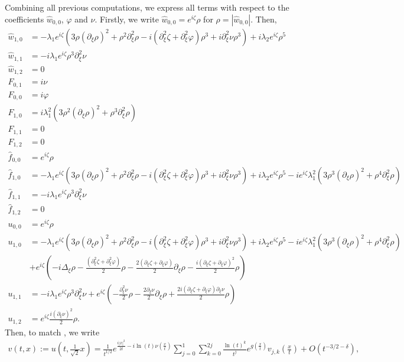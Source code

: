 \documentclass[a4paper, 15pt]{article}
\numberwithin{equation}{section}
\begin{document}
Combining all previous computations, we express all terms with respect to the coefficients $\hat{w}_{0,0}$, $\varphi$ and $\nu$. Firstly, we write $\hat{w}_{0,0}=e^{i\zeta}\rho$ for $\rho=|\hat{w}_{0,0}|$. Then, 
\begin{align*}
\hat{w}_{1,0}&=-\lambda_1e^{i\zeta}(3\rho(\partial_\xi\rho)^2+\rho^2\partial^2_\xi\rho-i(\partial_\xi^2\zeta+\partial_\xi^2\varphi)\rho^3+i\partial^2_\xi\nu\rho^3)+i\lambda_2e^{i\zeta}\rho^5\\
\hat{w}_{1,1}&=-i\lambda_1e^{i\zeta}\rho^3\partial^2_\xi\nu\\
\hat{w}_{1,2}&=0\\
F_{0,1}&=i\nu\\
F_{0,0}&=i\varphi\\
F_{1,0}&=i\lambda_1^2(3\rho^2(\partial_\xi\rho)^2+\rho^3\partial^2_\xi\rho)\\
F_{1,1}&=0\\
F_{1,2}&=0\\
\hat{f}_{0,0}&=e^{i\zeta}\rho\\
\hat{f}_{1,0}&=-\lambda_1e^{i\zeta}(3\rho(\partial_\xi\rho)^2+\rho^2\partial^2_\xi\rho-i(\partial_\xi^2\zeta+\partial_\xi^2\varphi)\rho^3+i\partial^2_\xi\nu\rho^3)+i\lambda_2e^{i\zeta}\rho^5-ie^{i\zeta}\lambda_1^2(3\rho^3(\partial_\xi\rho)^2+\rho^4\partial^2_\xi\rho)\\
\hat{f}_{1,1}&=-i\lambda_1e^{i\zeta}\rho^3\partial^2_\xi\nu\\
\hat{f}_{1,2}&=0\\
u_{0,0}&=e^{i\zeta}\rho\\
u_{1,0}&=-\lambda_1e^{i\zeta}(3\rho(\partial_\xi\rho)^2+\rho^2\partial^2_\xi\rho-i(\partial_\xi^2\zeta+\partial_\xi^2\varphi)\rho^3+i\partial^2_\xi\nu\rho^3)+i\lambda_2e^{i\zeta}\rho^5-ie^{i\zeta}\lambda_1^2(3\rho^3(\partial_\xi\rho)^2+\rho^4\partial^2_\xi\rho)\\
&+e^{i\zeta}(-i\Delta_\xi\rho-\frac{(\partial_\xi^2\zeta+\partial_\xi^2\varphi)}{2}\rho-\frac{2(\partial_\xi\zeta+\partial_\xi\varphi)}{2}\partial_\xi\rho-\frac{i(\partial_\xi\zeta+\partial_\xi\varphi)^2}{2}\rho)\\
u_{1,1}&=-i\lambda_1e^{i\zeta}\rho^3\partial^2_\xi\nu+e^{i\zeta}(-\frac{\partial_\xi^2\nu}{2}\rho-\frac{2\partial_\xi\nu}{2}\partial_\xi\rho+\frac{2i(\partial_\xi\zeta+\partial_\xi\varphi)\partial_\xi\nu}{2}\rho)\\
u_{1,2}&=e^{i\zeta}\frac{i(\partial_\xi\nu)^2}{2}\rho.
\end{align*}
Then, to match \cite{10.1063/1.522967}, we write 
\begin{align}
v(t,x):=u(t,\frac{1}{\sqrt{2}}x)=\frac{1 }{t^{1/2}}e^{\frac{i|x|^2}{2t}-i\ln(t)\nu\left(\frac{x}{t}\right)}\sum_{j=0}^{1}\sum_{k=0}^{2j}\frac{\ln(t)^k}{t^{j}}e^{g\left(\frac{x}{t}\right)}v_{j,k}\left(\frac{x}{t}\right)+O(t^{-3/2-\delta}),
\end{align}
\end{document}
